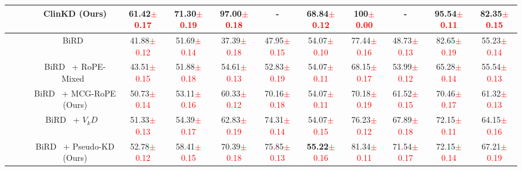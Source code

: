 \begin{table*}[t]
{\begin{tabular}{c|c|c|cccccccc|c}
\rowcolor[RGB]{255,245,235}
\cellcolor{white}\multirow{-6}{*}{\textbf{ROC}}   & \cellcolor{white}\multirow{-6}{*}{Recall} &ClinKD (Ours)& \textbf{61.42}\textcolor{red}{$\pm$0.17} & \textbf{71.30}\textcolor{red}{$\pm$0.19} & \textbf{97.00}\textcolor{red}{$\pm$0.18} & - & \textbf{68.84}\textcolor{red}{$\pm$0.12} &  \textbf{100}\textcolor{red}{$\pm$0.00}   & - & \textbf{95.54}\textcolor{red}{$\pm$0.11} & \textbf{82.35}\textcolor{red}{$\pm$0.15}  \\ \midrule
~   & ~ &BiRD~\cite{huang2024BiRD}& 41.88\textcolor{red}{$\pm$0.12} & 51.69\textcolor{red}{$\pm$0.14} & 37.39\textcolor{red}{$\pm$0.18} & 47.95\textcolor{red}{$\pm$0.15} & 54.07\textcolor{red}{$\pm$0.10} & 77.44\textcolor{red}{$\pm$0.16} & 48.73\textcolor{red}{$\pm$0.13} & 82.65\textcolor{red}{$\pm$0.19} & 55.23\textcolor{red}{$\pm$0.14}    \\
~   & ~ &BiRD~\cite{huang2024BiRD} + RoPE-Mixed~\cite{heo2024rotarypositionembeddingvision}& 43.51\textcolor{red}{$\pm$0.15} & 51.88\textcolor{red}{$\pm$0.18} & 54.61\textcolor{red}{$\pm$0.13} & 52.83\textcolor{red}{$\pm$0.19} & 54.07\textcolor{red}{$\pm$0.11} & 68.15\textcolor{red}{$\pm$0.17} & 53.99\textcolor{red}{$\pm$0.12} & 65.28\textcolor{red}{$\pm$0.14} & 55.54\textcolor{red}{$\pm$0.13}    \\
\rowcolor[RGB]{237,238,254}
\cellcolor{white}~   & \cellcolor{white}~ &BiRD~\cite{huang2024BiRD} + MCG-RoPE (Ours)& 50.73\textcolor{red}{$\pm$0.14} & 53.11\textcolor{red}{$\pm$0.16} & 60.33\textcolor{red}{$\pm$0.12} & 70.16\textcolor{red}{$\pm$0.18} & 54.07\textcolor{red}{$\pm$0.11} & 70.18\textcolor{red}{$\pm$0.19} & 61.52\textcolor{red}{$\pm$0.15} & 70.46\textcolor{red}{$\pm$0.17} & 61.32\textcolor{red}{$\pm$0.13}    \\
~   & ~ &BiRD~\cite{huang2024BiRD} + $V_{k}D$ ~\cite{Miles_2024_CVPR} & 51.33\textcolor{red}{$\pm$0.13} & 54.39\textcolor{red}{$\pm$0.17} & 62.83\textcolor{red}{$\pm$0.19} & 74.31\textcolor{red}{$\pm$0.14} & 54.07\textcolor{red}{$\pm$0.15} & 76.23\textcolor{red}{$\pm$0.12} & 67.89\textcolor{red}{$\pm$0.18} & 72.15\textcolor{red}{$\pm$0.11} & 64.15\textcolor{red}{$\pm$0.16}    \\
\rowcolor[RGB]{237,238,254}
\cellcolor{white}~   &\cellcolor{white} ~ &BiRD~\cite{huang2024BiRD} + Pseudo-KD (Ours)& 52.78\textcolor{red}{$\pm$0.12} & 58.41\textcolor{red}{$\pm$0.15} & 70.39\textcolor{red}{$\pm$0.18} & 75.85\textcolor{red}{$\pm$0.13} & \textbf{55.22}\textcolor{red}{$\pm$0.16} & 81.34\textcolor{red}{$\pm$0.11} & 71.54\textcolor{red}{$\pm$0.17} & 72.15\textcolor{red}{$\pm$0.14} & 67.21\textcolor{red}{$\pm$0.19}    \\

\end{tabular}}
\end{table*}
